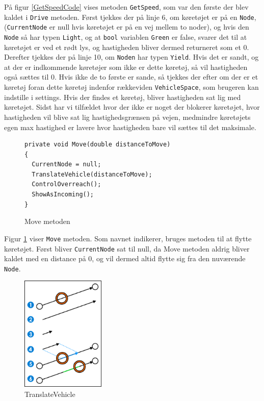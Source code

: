 På figur \ref{GetSpeedCode} vises metoden \texttt{GetSpeed}, som var den første der blev kaldet i \texttt{Drive} metoden. Først tjekkes der på linje 6, om køretøjet er på en \texttt{Node}, (\texttt{CurrentNode} er null hvis køretøjet er på en vej mellem to noder), og hvis den \texttt{Node} så har typen \texttt{Light}, og at \texttt{bool} variablen \texttt{Green} er false, svarer det til at køretøjet er ved et rødt lys, og hastigheden bliver dermed returneret som et 0. Derefter tjekkes der på linje 10, om \texttt{Noden} har typen \texttt{Yield}. Hvis det er sandt, og at der er indkommende køretøjer som ikke er dette køretøj, så vil hastigheden også sættes til 0. Hvis ikke de to første er sande, så tjekkes der efter om der er et køretøj foran dette køretøj indenfor rækkeviden \texttt{VehicleSpace}, som brugeren kan indstille i settings. Hvis der findes et køretøj, bliver hastigheden sat lig med køretøjet. Sidst har vi tilfældet hvor der ikke er noget der blokerer køretøjet, hvor hastigheden vil blive sat lig hastighedsgrænsen på vejen, medmindre køretøjets egen max hastighed er lavere hvor hastigheden bare vil sættes til det maksimale.

\begin{figure}[H]
\begin{lstlisting}
private void Move(double distanceToMove)
{
  CurrentNode = null;
  TranslateVehicle(distanceToMove);
  ControlOverreach();
  ShowAsIncoming();
}
\end{lstlisting}
\caption{Move metoden}\label{MoveCode}
\end{figure}

Figur \ref{MoveCode} viser \texttt{Move} metoden. Som navnet indikerer, bruges metoden til at flytte køretøjet. Først bliver \texttt{CurrentNode} sat til null, da Move metoden aldrig bliver kaldet med en distance på 0, og vil dermed altid flytte sig fra den nuværende \texttt{Node}. 

\begin{figure}
    \centering
    \includegraphics[width=4cm,keepaspectratio]{Pictures/Implementation/TranslateVehicle}
    \caption{TranslateVehicle}
    \label{TranslateVehicle}
\end{figure}

